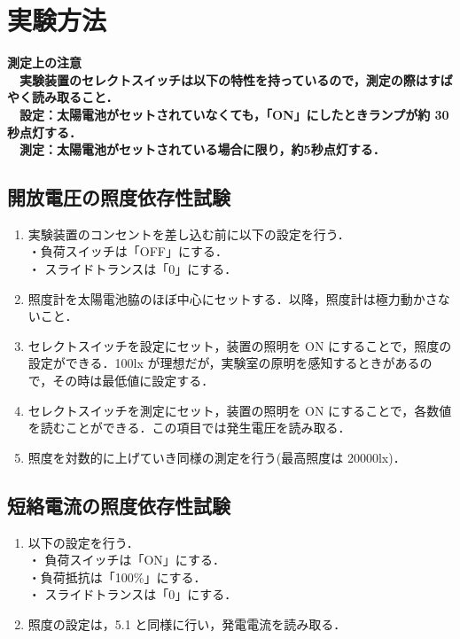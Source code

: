 \section{実験方法}
\bf{測定上の注意}\\
　実験装置のセレクトスイッチは以下の特性を持っているので，測定の際はすばやく読み取ること．\\
　設定：太陽電池がセットされていなくても，「ON」にしたときランプが約 30 秒点灯する． \\
　測定：太陽電池がセットされている場合に限り，約5秒点灯する．\\

\subsection{開放電圧の照度依存性試験}
\begin{enumerate}
  \item 実験装置のコンセントを差し込む前に以下の設定を行う．\\
  ・負荷スイッチは「OFF」にする．\\
  ・ スライドトランスは「0」にする．
  \item 照度計を太陽電池脇のほぼ中心にセットする．以降，照度計は極力動かさないこと．
  \item セレクトスイッチを設定にセット，装置の照明を ON にすることで，照度の設定ができる．100lx が理想だが，実験室の原明を感知するときがあるので，その時は最低値に設定する．
  \item セレクトスイッチを測定にセット，装置の照明を ON にすることで，各数値を読むことができる．この項目では発生電圧を読み取る．
  \item 照度を対数的に上げていき同様の測定を行う(最高照度は 20000lx)．
\end{enumerate}

\subsection{短絡電流の照度依存性試験}
\begin{enumerate}
  \item 以下の設定を行う．\\
  ・ 負荷スイッチは「ON」にする．\\
  ・負荷抵抗は「100\%」にする．\\
  ・ スライドトランスは「0」にする．
  \item 照度の設定は，5.1 と同様に行い，発電電流を読み取る．
\end{enumerate}

